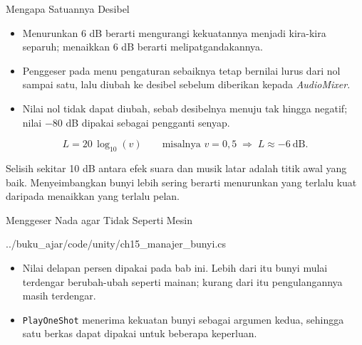 \documentclass[aspectratio=169,10pt]{beamer}
\begin{document}
\begin{frame}{Mengapa Satuannya Desibel}
\begin{itemize}
  \item Menurunkan 6 dB berarti mengurangi kekuatannya menjadi kira-kira
        separuh; menaikkan 6 dB berarti melipatgandakannya.
  \item Penggeser pada menu pengaturan sebaiknya tetap bernilai lurus dari nol
        sampai satu, lalu diubah ke desibel sebelum diberikan kepada
        \emph{AudioMixer}.
  \item Nilai nol tidak dapat diubah, sebab desibelnya menuju tak hingga
        negatif; nilai $-80$ dB dipakai sebagai pengganti senyap.
\end{itemize}
\[
L = 20\,\log_{10}(v)
\qquad\text{misalnya } v = 0{,}5 \;\Rightarrow\; L \approx -6\ \text{dB}.
\]
\begin{kotak}
Selisih sekitar 10 dB antara efek suara dan musik latar adalah titik awal yang
baik. Menyeimbangkan bunyi lebih sering berarti menurunkan yang terlalu kuat
daripada menaikkan yang terlalu pelan.
\end{kotak}
\end{frame}

\begin{frame}[fragile]{Menggeser Nada agar Tidak Seperti Mesin}

  {../buku_ajar/code/unity/ch15_manajer_bunyi.cs}
\begin{itemize}
  \item Nilai delapan persen dipakai pada bab ini. Lebih dari itu bunyi mulai
        terdengar berubah-ubah seperti mainan; kurang dari itu pengulangannya
        masih terdengar.
  \item \texttt{PlayOneShot} menerima kekuatan bunyi sebagai argumen kedua,
        sehingga satu berkas dapat dipakai untuk beberapa keperluan.
\end{itemize}
\end{frame}
\end{document}
